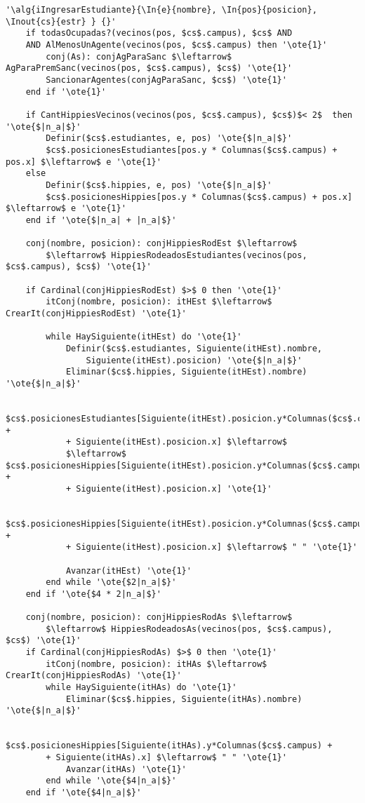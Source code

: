 \begin{lstlisting}[mathescape]
'\alg{iIngresarEstudiante}{\In{e}{nombre}, \In{pos}{posicion}, \Inout{cs}{estr} } {}'
	if todasOcupadas?(vecinos(pos, $cs$.campus), $cs$ AND 
	AND AlMenosUnAgente(vecinos(pos, $cs$.campus) then '\ote{1}'
		conj(As): conjAgParaSanc $\leftarrow$ AgParaPremSanc(vecinos(pos, $cs$.campus), $cs$) '\ote{1}'
		SancionarAgentes(conjAgParaSanc, $cs$) '\ote{1}'
	end if '\ote{1}'

	if CantHippiesVecinos(vecinos(pos, $cs$.campus), $cs$)$< 2$  then '\ote{$|n_a|$}'
		Definir($cs$.estudiantes, e, pos) '\ote{$|n_a|$}'
		$cs$.posicionesEstudiantes[pos.y * Columnas($cs$.campus) + pos.x] $\leftarrow$ e '\ote{1}'
	else
		Definir($cs$.hippies, e, pos) '\ote{$|n_a|$}'
		$cs$.posicionesHippies[pos.y * Columnas($cs$.campus) + pos.x] $\leftarrow$ e '\ote{1}'
	end if '\ote{$|n_a| + |n_a|$}'
	
	conj(nombre, posicion): conjHippiesRodEst $\leftarrow$ 
		$\leftarrow$ HippiesRodeadosEstudiantes(vecinos(pos, $cs$.campus), $cs$) '\ote{1}'

	if Cardinal(conjHippiesRodEst) $>$ 0 then '\ote{1}'
		itConj(nombre, posicion): itHEst $\leftarrow$ CrearIt(conjHippiesRodEst) '\ote{1}'
		
		while HaySiguiente(itHEst) do '\ote{1}'
			Definir($cs$.estudiantes, Siguiente(itHEst).nombre, 
				Siguiente(itHEst).posicion) '\ote{$|n_a|$}'
			Eliminar($cs$.hippies, Siguiente(itHEst).nombre) '\ote{$|n_a|$}'
			
			$cs$.posicionesEstudiantes[Siguiente(itHEst).posicion.y*Columnas($cs$.campus) + 
			+ Siguiente(itHEst).posicion.x] $\leftarrow$ 
			$\leftarrow$ $cs$.posicionesHippies[Siguiente(itHEst).posicion.y*Columnas($cs$.campus) + 
			+ Siguiente(itHest).posicion.x] '\ote{1}'
			
			$cs$.posicionesHippies[Siguiente(itHEst).posicion.y*Columnas($cs$.campus) + 
			+ Siguiente(itHest).posicion.x] $\leftarrow$ " " '\ote{1}'
			
			Avanzar(itHEst) '\ote{1}'
		end while '\ote{$2|n_a|$}'
	end if '\ote{$4 * 2|n_a|$}'

	conj(nombre, posicion): conjHippiesRodAs $\leftarrow$
		$\leftarrow$ HippiesRodeadosAs(vecinos(pos, $cs$.campus), $cs$) '\ote{1}'
	if Cardinal(conjHippiesRodAs) $>$ 0 then '\ote{1}'
		itConj(nombre, posicion): itHAs $\leftarrow$ CrearIt(conjHippiesRodAs) '\ote{1}'	
		while HaySiguiente(itHAs) do '\ote{1}'
			Eliminar($cs$.hippies, Siguiente(itHAs).nombre) '\ote{$|n_a|$}'
			
			$cs$.posicionesHippies[Siguiente(itHAs).y*Columnas($cs$.campus) +
		+ Siguiente(itHAs).x] $\leftarrow$ " " '\ote{1}'
			Avanzar(itHAs) '\ote{1}'
		end while '\ote{$4|n_a|$}'
	end if '\ote{$4|n_a|$}'


\end{lstlisting}
